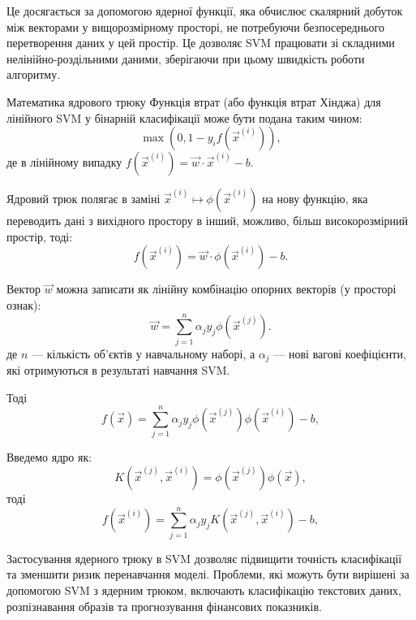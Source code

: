 \documentclass[]{article}
\begin{document}
Це досягається за допомогою ядерної функції, яка обчислює скалярний добуток між векторами у вищорозмірному просторі, не потребуючи безпосереднього перетворення даних у цей простір. Це дозволяє SVM працювати зі складними нелінійно-роздільними даними, зберігаючи при цьому швидкість роботи алгоритму.

\begin{mathbox}{Математика ядрового трюку}
Функція втрат (або функція втрат Хінджа) для лінійного SVM у бінарній класифікації може бути подана таким чином:
\begin{equation*}
    \max\left(0, 1- y_i f(\vec{x}^{(i)})\right),
\end{equation*}
де в лінійному випадку $f(\vec{x}^{(i)}) = \vec{w}\cdot\vec{x}^{(i)} - b$.

Ядровий трюк полягає в заміні $\vec{x}^{(i)} \mapsto \phi(\vec{x}^{(i)})$ на нову функцію, яка переводить дані з вихідного простору в інший, можливо, більш високорозмірний простір, тоді:
\begin{equation*}
    f(\vec{x}^{(i)}) = \vec{w}\cdot\phi(\vec{x}^{(i)}) - b.
\end{equation*}

Вектор $\vec{w}$ можна записати як лінійну комбінацію опорних векторів (у просторі ознак):
\begin{equation*}
    \vec{w} = \sum_{j = 1}^n \alpha_j y_j \phi(\vec{x}^{(j)}).
\end{equation*}
де $n$ --- кількість об'єктів у навчальному наборі, а $\alpha_j$ --- нові вагові коефіцієнти, які отримуються в результаті навчання SVM.

Тоді
\begin{equation*}
     f(\vec{x}) = \sum_{j = 1}^n \alpha_j y_j \phi(\vec{x}^{(j)}) \phi(\vec{x}^{(i)}) - b,
\end{equation*}

Введемо ядро як:
\begin{equation*}
    K(\vec{x}^{(j)}, \vec{x}^{(i)}) = \phi(\vec{x}^{(j)}) \phi(\vec{x}),
\end{equation*}
тоді
\begin{equation*}
     f(\vec{x}^{(i)}) = \sum_{j = 1}^n \alpha_j y_j  K(\vec{x}^{(j)}, \vec{x}^{(i)})  - b,
\end{equation*}

\end{mathbox}

Застосування ядерного трюку в SVM дозволяє підвищити точність класифікації та зменшити ризик перенавчання моделі. Проблеми, які можуть бути вирішені за допомогою SVM з ядерним трюком, включають класифікацію текстових даних, розпізнавання образів та прогнозування фінансових показників.
\end{document}
